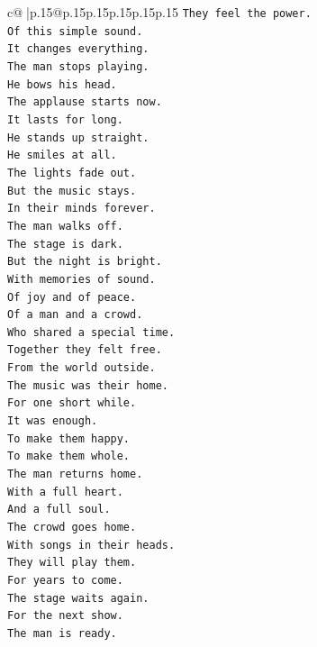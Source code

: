 \documentclass{article}
\begin{document}
{\begin{supertabular}{c@{$\;$}|p{.15\linewidth}@{}p{.15\linewidth}p{.15\linewidth}p{.15\linewidth}p{.15\linewidth}p{.15\linewidth}}
{{{\texttt{They feel the power.} \\
\texttt{Of this simple sound.} \\
\texttt{It changes everything.} \\
\texttt{The man stops playing.} \\
\texttt{He bows his head.} \\
\texttt{The applause starts now.} \\
\texttt{It lasts for long.} \\
\texttt{He stands up straight.} \\
\texttt{He smiles at all.} \\
\texttt{The lights fade out.} \\
\texttt{But the music stays.} \\
\texttt{In their minds forever.} \\
\texttt{The man walks off.} \\
\texttt{The stage is dark.} \\
\texttt{But the night is bright.} \\
\texttt{With memories of sound.} \\
\texttt{Of joy and of peace.} \\
\texttt{Of a man and a crowd.} \\
\texttt{Who shared a special time.} \\
\texttt{Together they felt free.} \\
\texttt{From the world outside.} \\
\texttt{The music was their home.} \\
\texttt{For one short while.} \\
\texttt{It was enough.} \\
\texttt{To make them happy.} \\
\texttt{To make them whole.} \\
\texttt{The man returns home.} \\
\texttt{With a full heart.} \\
\texttt{And a full soul.} \\
\texttt{The crowd goes home.} \\
\texttt{With songs in their heads.} \\
\texttt{They will play them.} \\
\texttt{For years to come.} \\
\texttt{The stage waits again.} \\
\texttt{For the next show.} \\
\texttt{The man is ready.} \\
}}}
\end{supertabular}}
\end{document}

